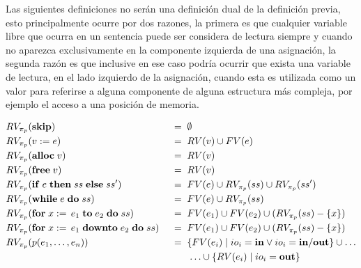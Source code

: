 Las siguientes definiciones no serán una definición dual de la definición previa, esto principalmente ocurre por dos razones, la primera es que cualquier variable libre que
ocurra en un sentencia puede ser considera de lectura siempre y cuando no aparezca exclusivamente en la componente izquierda de una asignación, la segunda razón es que inclusive en ese caso podría ocurrir que exista una variable de lectura, en el lado izquierdo de la asignación, cuando esta es utilizada como un valor para referirse a alguna componente de alguna estructura más compleja, por ejemplo el acceso a una posición de memoria.

\begin{alignat*}{2}
&RV_{\pi_{p}}(\mathbf{skip})
&&\;=\;
\emptyset
\\
&RV_{\pi_{p}}(v := e)
&&\;=\;
RV(v) \cup FV(e)
\\
&RV_{\pi_{p}}(\mathbf{alloc} \; v)
&&\;=\;
RV(v)
\\
&RV_{\pi_{p}}(\mathbf{free} \; v)
&&\;=\;
RV(v)
\\
&RV_{\pi_{p}}(\mathbf{if} \; e \; \mathbf{then} \; ss \; \mathbf{else} \; ss')
&&\;=\;
FV(e) \cup RV_{\pi_{p}}(ss) \cup RV_{\pi_{p}}(ss')
\\
&RV_{\pi_{p}}(\mathbf{while} \; e \; \mathbf{do} \; ss)
&&\;=\;
FV(e) \cup RV_{\pi_{p}}(ss)
\\
&RV_{\pi_{p}}(\mathbf{for} \; x := \, e_1 \; \mathbf{to} \; e_2 \; \mathbf{do} \; ss)
&&\;=\;
FV(e_1) \cup FV(e_2) \cup (RV_{\pi_{p}}(ss) - \{ x \})
\\
&RV_{\pi_{p}}(\mathbf{for} \; x := \, e_1 \; \mathbf{downto} \; e_2 \; \mathbf{do} \; ss)
&&\;=\;
FV(e_1) \cup FV(e_2) \cup (RV_{\pi_{p}}(ss) - \{ x \})
\\
&RV_{\pi_{p}}(p(e_1, \ldots, e_n))
&&\;=\;
\{ FV(e_i) \mid io_i = \mathbf{in} \vee io_i = \mathbf{in/out} \}
\cup \ldots
\\&&&\qquad
\ldots \cup
\{ RV(e_i) \mid io_i = \mathbf{out} \}
\end{alignat*}

